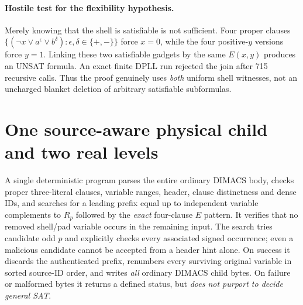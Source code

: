 \documentclass[11pt]{article}
\begin{document}
\paragraph{Hostile test for the flexibility hypothesis.}
Merely knowing that the shell is satisfiable is not sufficient. Four proper clauses $\{(\neg x\lor a^\epsilon\lor b^\delta):\epsilon,\delta\in\{+,-\}\}$ force $x=0$, while the four positive-$y$ versions force $y=1$. Linking these two satisfiable gadgets by the same $E(x,y)$ produces an UNSAT formula. An exact finite DPLL run rejected the join after 715 recursive calls. Thus the proof genuinely uses \emph{both} uniform shell witnesses, not an uncharged blanket deletion of arbitrary satisfiable subformulas.

\section{One source-aware physical child and two real levels}
A single deterministic program parses the entire ordinary DIMACS body, checks proper three-literal clauses, variable ranges, header, clause distinctness and dense IDs, and searches for a leading prefix equal up to independent variable complements to $R_p$ followed by the \emph{exact} four-clause $E$ pattern. It verifies that no removed shell/pad variable occurs in the remaining input. The search tries candidate odd $p$ and explicitly checks every associated signed occurrence; even a malicious candidate cannot be accepted from a header hint alone. On success it discards the authenticated prefix, renumbers every surviving original variable in sorted source-ID order, and writes \emph{all} ordinary DIMACS child bytes. On failure or malformed bytes it returns a defined status, but \emph{does not purport to decide general SAT}.
\end{document}
